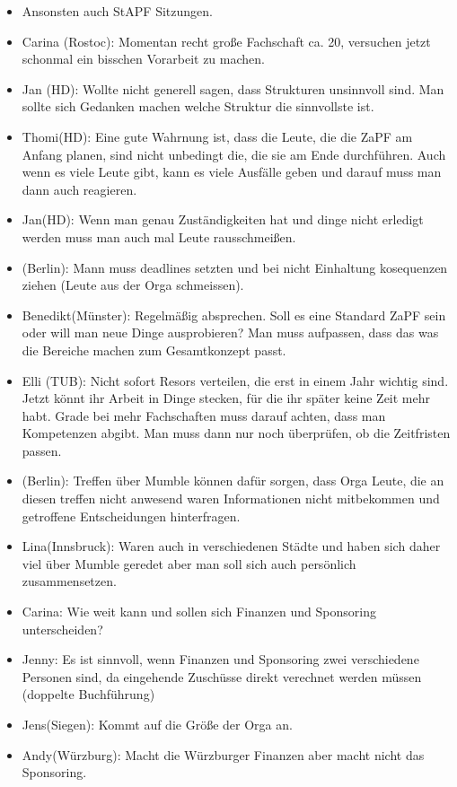 \begin{itemize}
      \item Ansonsten auch StAPF Sitzungen.
      \item Carina (Rostoc): Momentan recht große Fachschaft ca. 20, versuchen jetzt schonmal ein bisschen Vorarbeit zu machen.
      \item Jan (HD): Wollte nicht generell sagen, dass Strukturen unsinnvoll sind. Man sollte sich Gedanken machen welche Struktur die sinnvollste ist.
      \item Thomi(HD): Eine gute Wahrnung ist, dass die Leute, die die ZaPF am Anfang planen, sind nicht unbedingt die, die sie am Ende durchführen. Auch wenn es viele Leute gibt, kann es viele Ausfälle geben und darauf muss man dann auch reagieren.
      \item Jan(HD): Wenn man genau Zuständigkeiten hat und dinge nicht erledigt werden muss man auch mal Leute rausschmeißen.
      \item (Berlin): Mann muss deadlines setzten und bei nicht Einhaltung kosequenzen ziehen (Leute aus der Orga schmeissen).
      \item Benedikt(Münster): Regelmäßig absprechen. Soll es eine Standard ZaPF sein oder will man neue Dinge ausprobieren? Man muss aufpassen, dass das was die Bereiche machen zum Gesamtkonzept passt.
      \item Elli (TUB): Nicht sofort Resors verteilen, die erst in einem Jahr wichtig sind. Jetzt könnt ihr Arbeit in Dinge stecken, für die ihr später keine Zeit mehr habt. Grade bei mehr Fachschaften muss darauf achten, dass man Kompetenzen abgibt. Man muss dann nur noch überprüfen, ob die Zeitfristen passen.
      \item (Berlin): Treffen über Mumble können dafür sorgen, dass Orga Leute, die an diesen treffen nicht anwesend waren Informationen nicht mitbekommen und getroffene Entscheidungen hinterfragen.
      \item Lina(Innsbruck): Waren auch in verschiedenen Städte und haben sich daher viel über Mumble geredet aber man soll sich auch persönlich zusammensetzen.
      \item Carina: Wie weit kann und sollen sich Finanzen und Sponsoring unterscheiden?
      \item Jenny: Es ist sinnvoll, wenn Finanzen und Sponsoring zwei verschiedene Personen sind, da eingehende Zuschüsse direkt verechnet werden müssen  (doppelte Buchführung)
      \item Jens(Siegen): Kommt auf die Größe der Orga an.
      \item Andy(Würzburg): Macht die Würzburger Finanzen aber macht nicht das Sponsoring.

\end{itemize}
